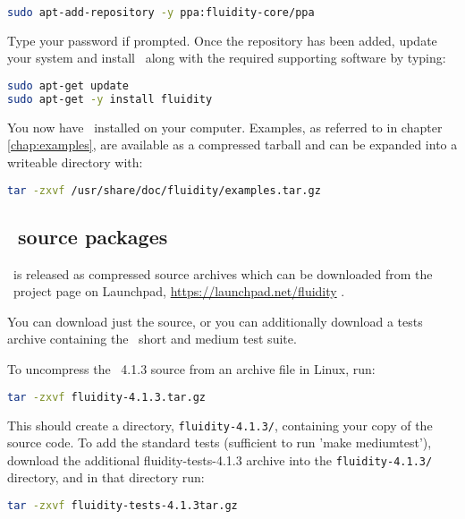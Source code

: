 \begin{lstlisting}[language=Bash]
sudo apt-add-repository -y ppa:fluidity-core/ppa
\end{lstlisting}

Type your password if prompted. Once the repository has been added, update your
system and install \fluidity\ along with the required supporting software by
typing:

\begin{lstlisting}[language=Bash]
sudo apt-get update
sudo apt-get -y install fluidity
\end{lstlisting}

You now have \fluidity\ installed on your computer. Examples, as referred to in
chapter \ref{chap:examples}, are available as a compressed tarball and can be
expanded into a writeable directory with:

\begin{lstlisting}[language=Bash]
tar -zxvf /usr/share/doc/fluidity/examples.tar.gz
\end{lstlisting}

\subsection{\fluidity\ source packages}

\fluidity\ is released as compressed source archives which can be downloaded
from the \fluidity\ project page on Launchpad,
\href{https://launchpad.net/fluidity}{https://launchpad.net/fluidity} .

You can download just the source, or you can additionally download a tests
archive containing the \fluidity\ short and medium test suite.

To uncompress the \fluidity\ 4.1.3 source from an archive file in Linux,
run:

\begin{lstlisting}[language=Bash]
tar -zxvf fluidity-4.1.3.tar.gz
\end{lstlisting}

This should create a directory, \lstinline[language=Bash]+fluidity-4.1.3/+,
containing your copy of the source code. To add the standard tests (sufficient
to run 'make mediumtest'), download the additional fluidity-tests-4.1.3
archive into the \lstinline[language=Bash]+fluidity-4.1.3/+ directory, and in
that directory run:

\begin{lstlisting}[language=Bash]
tar -zxvf fluidity-tests-4.1.3tar.gz
\end{lstlisting}

